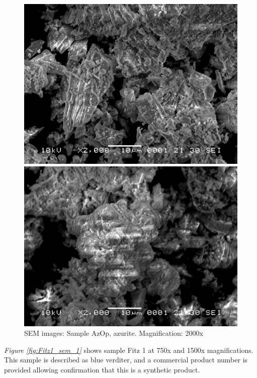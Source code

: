 \begin{figure}[H]
\centering
\begin{minipage}{.45\textwidth}
  \centering
  \includegraphics[width=\linewidth]{AzOp_x2000_1_150321}
\end{minipage}
\begin{minipage}{.45\textwidth}
  \centering
  \includegraphics[width=\linewidth]{AzOp_x2000_4_150321}
\end{minipage}
\caption[SEM images: Sample AzOp, azurite]{SEM images: Sample AzOp, azurite. Magnification: 2000x}
\label{fig:azop_sem_2}
\end{figure}

\textit{Figure \ref{fig:Fitz1_sem_1}} shows sample Fitz 1 at 750x and 1500x magnifications. This sample is described as blue verditer, and a commercial product number is provided allowing confirmation that this is a synthetic product.

